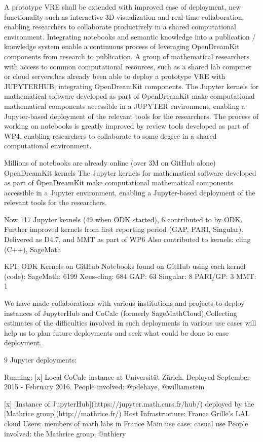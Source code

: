 \begin{Aim 1}
\begin{Aim 2}
\begin{itemize}
A prototype VRE shall be extended with improved ease of deployment, new functionality such as interactive 3D visualization and real-time 
collaboration, enabling researchers to collaborate productively in a shared computational environment. Integrating notebooks and semantic 
knowledge into a publication / knowledge system enable a continuous process of leveraging OpenDreamKit components from research to 
publication.
A group of mathematical researchers with access to common computational resources, such as a shared lab computer or cloud servers,has 
already been able to deploy a prototype VRE with JUPYTERHUB, integrating OpenDreamKit components. The Jupyter kernels for mathematical 
software developed as part of OpenDreamKit make computational mathematical components accessible in a JUPYTER environment, enabling a 
Jupyter-based deployment of the relevant tools for the researchers. The process of working on notebooks is greatly improved by review tools 
developed as part of WP4, enabling researchers to collaborate to some degree in a shared computational environment.

Millions of notebooks are already online (over 3M on GitHub alone)
OpenDreamKit kernels
The Jupyter kernels for mathematical software  developed as part of OpenDreamKit make computational mathematical components accessible in a Jupyter environment, enabling a Jupyter-based deployment of the relevant tools for the researchers.

Now 117 Jupyter kernels (49 when ODK started), 6 contributed to by ODK.
Further improved kernels from first reporting period (GAP, PARI, Singular). 
Delivered as D4.7, and MMT as part of WP6
Also contributed to kernels: cling (C++), SageMath

KPI: ODK Kernels on GitHub
Notebooks found on GitHub using each kernel (code):
SageMath: 6199
Xeus-cling: 684
GAP: 63
Singular: 8
PARI/GP: 3
MMT: 1

We have made collaborations with various institutions and projects to deploy instances of JupyterHub and CoCalc (formerly SageMathCloud),Collecting estimates of the difficulties involved in such deployments in various use cases will help us to plan future deployments and seek what could be done to ease deployment.
    
9 Jupyter deployments:

  Running:
  [x] Local CoCalc instance at Universität Zürich.
      Deployed September 2015 - February 2016.
      People involved: @pdehaye, @williamstein
      
  [x] [Instance of JupyterHub](https://jupyter.math.cnrs.fr/hub/) deployed by the [Mathrice group](http://mathrice.fr/)
      Host Infrastructure: France Grille's LAL cloud
      Users: members of math labs in France
      Main use case: casual use 
      People involved: the Mathrice group, @nthiery


\end{itemize}
\end{Aim 2}
\end{Aim 1}
